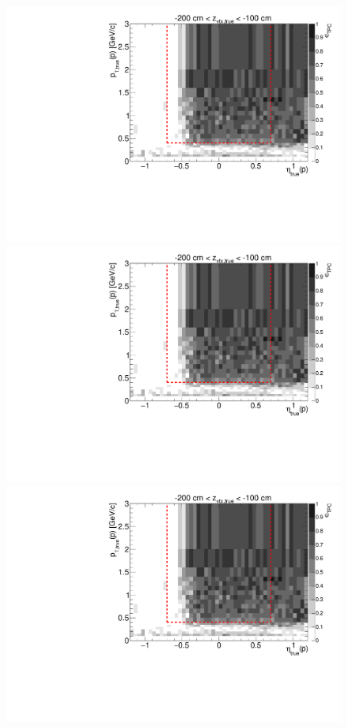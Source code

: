 \begin{figure}[hb]
{  \includegraphics[width=\linewidth,page=6]{graphics/eff/Eff2D_TPC_proton_Minus.pdf}\\
  \includegraphics[width=\linewidth,page=8]{graphics/eff/Eff2D_TPC_proton_Minus.pdf}\\
  \includegraphics[width=\linewidth,page=10]{graphics/eff/Eff2D_TPC_proton_Minus.pdf}
}%
\end{figure}
